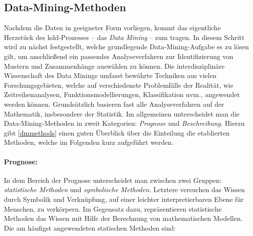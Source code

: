 \subsection{Data-Mining-Methoden}
\label{dmmethoden}

Nachdem die Daten in geeigneter Form vorliegen, kommt das eigentliche Herzstück des \gls{kdd}-Prozesses -- das \textit{Data Mining} -- zum tragen. In diesem Schritt wird zu nächst festgestellt, welche grundlegende Data-Mining-Aufgabe es zu lösen gilt, um anschließend ein passendes Analyseverfahren zur Identifizierung von Mustern und Zusammenhänge auswählen zu können. Die interdisziplinäre Wissenschaft des Data Minings umfasst bewährte Techniken aus vielen Forschungsgebieten, welche auf verschiedenste Problemfälle der Realität, wie Zeitreihenanalysen, Funktionsmodellierungen, Klassifikation uvm., angewendet werden können. Grundsätzlich basieren fast alle Analyseverfahren auf der Mathematik, insbesondere der Statistik. Im allgemeinen unterscheidet man die Data-Mining-Methoden in zweit Kategorien: \textit{Prognose} und \textit{Beschreibung}. Hierzu gibt \vref{dmmethods} einen guten Überblick über die Einteilung die etablierten Methoden, welche im Folgenden kurz aufgeführt werden.

\paragraph{Prognose:} In dem Bereich der Prognose unterscheidet man zwischen zwei Gruppen: \textit{statistische Methoden} und \textit{symbolische Methoden}. Letztere versuchen das Wissen durch Symbolik und Verknüpfung, auf einer leichter interpretierbaren Ebene für Menschen, zu verkörpern. Im Gegensatz dazu, repräsentieren statistische Methoden das Wissen mit Hilfe der Berechnung von mathematischen Modellen. Die am häufigst angewendeten statischen Methoden sind:

